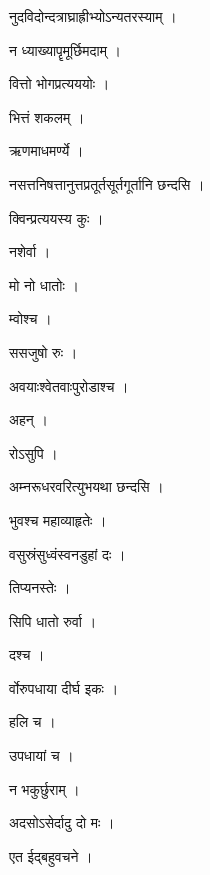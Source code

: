 \documentclass[10pt, openany]{book}
\begin{document}
\noindent नुदविदोन्दत्राघ्राह्रीभ्योऽन्यतरस्याम् ।

\noindent न ध्याख्यापॄमूर्छिमदाम् ।

\noindent वित्तो भोगप्रत्यययोः ।

\noindent भित्तं शकलम् ।

\noindent ऋणमाधमर्ण्ये ।

\noindent नसत्तनिषत्तानुत्तप्रतूर्तसूर्तगूर्तानि छन्दसि ।

\noindent क्विन्प्रत्ययस्य कुः ।

\noindent नशेर्वा ।

\noindent मो नो धातोः ।

\noindent म्वोश्च ।

\noindent ससजुषो रुः ।

\noindent अवयाःश्वेतवाःपुरोडाश्च ।

\noindent अहन् ।

\noindent रोऽसुपि ।

\noindent अम्नरूधरवरित्युभयथा छन्दसि ।

\noindent भुवश्च महाव्याहृतेः ।

\noindent वसुस्रंसुध्वंस्वनडुहां दः ।

\noindent तिप्यनस्तेः ।

\noindent सिपि धातो रुर्वा ।

\noindent दश्च ।

\noindent र्वोरुपधाया दीर्घ इकः ।

\noindent हलि च ।

\noindent उपधायां च ।

\noindent न भकुर्छुराम् ।

\noindent अदसोऽसेर्दादु दो मः ।

\noindent एत ईद्बहुवचने ।
\end{document}
